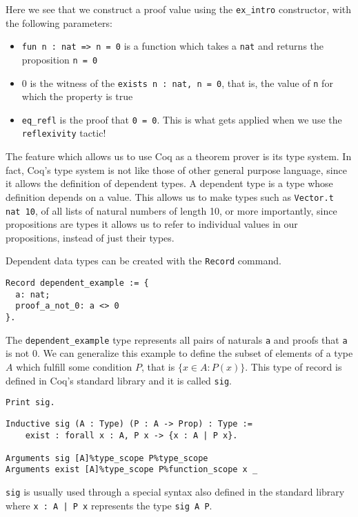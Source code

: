 Here we see that we construct a proof value using the \texttt{ex_intro} constructor, with the
following parameters:
\begin{itemize}
    \item \texttt{fun n : nat => n = 0} is a function which takes a \texttt{nat} and returns the proposition \texttt{n = 0}
    \item 0 is the witness of the \texttt{exists n : nat, n = 0}, that is, the value of \texttt{n} for which the property is true
    \item \texttt{eq_refl} is the proof that \texttt{0 = 0}. This is what gets applied when we use the \texttt{reflexivity} tactic!
\end{itemize}

The feature which allows us to use Coq as a theorem prover is its type system. In fact, Coq's type system
is not like those of other general purpose language, since it allows the definition of dependent types. A
dependent type is a type whose definition depends on a value. This allows us to make types such as 
\texttt{Vector.t nat 10}, of all lists of natural numbers of length 10, 
or more importantly, since propositions are types it allows us to refer to individual values in our
propositions, instead of just their types.

Dependent data types can be created with the \texttt{Record} command.
\begin{verbatim}
Record dependent_example := {
  a: nat;
  proof_a_not_0: a <> 0
}.
\end{verbatim}
The \texttt{dependent_example} type represents all pairs of naturals 
\texttt{a} and
proofs that \texttt{a} is not 0. We can generalize this example to define the subset of 
elements of a type $A$ which fulfill some condition $P$, that is $\{x \in A : P (x)\}$. This type of record is defined in Coq's standard
library and it is called \texttt{sig}.

\begin{verbatim}
Print sig.
\end{verbatim}
\vspace{-\baselineskip*3/2}
\begin{verbatim}
Inductive sig (A : Type) (P : A -> Prop) : Type :=
    exist : forall x : A, P x -> {x : A | P x}.

Arguments sig [A]%type_scope P%type_scope
Arguments exist [A]%type_scope P%function_scope x _
\end{verbatim}
\noindent \texttt{sig} is usually used through a special syntax also defined in the standard library
where \texttt{{x : A | P x}} represents the type \texttt{sig A P}.

